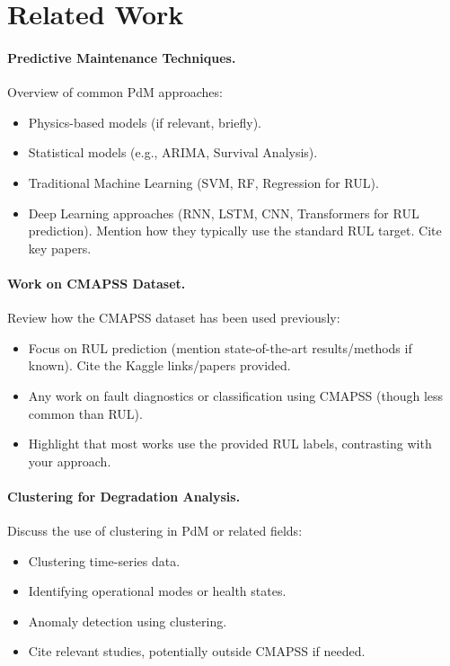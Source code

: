 \section{Related Work}
\label{sec:related_work}


\paragraph{Predictive Maintenance Techniques.}
Overview of common PdM approaches:
\begin{itemize}
    \item Physics-based models (if relevant, briefly).
    \item Statistical models (e.g., ARIMA, Survival Analysis).
    \item Traditional Machine Learning (SVM, RF, Regression for RUL).
    \item Deep Learning approaches (RNN, LSTM, CNN, Transformers for RUL prediction). Mention how they typically use the standard RUL target. Cite key papers.
\end{itemize}

\paragraph{Work on CMAPSS Dataset.}
Review how the CMAPSS dataset has been used previously:
\begin{itemize}
    \item Focus on RUL prediction (mention state-of-the-art results/methods if known). Cite the Kaggle links/papers provided.
    \item Any work on fault diagnostics or classification using CMAPSS (though less common than RUL).
    \item Highlight that most works use the provided RUL labels, contrasting with your approach.
\end{itemize}

\paragraph{Clustering for Degradation Analysis.}
Discuss the use of clustering in PdM or related fields:
\begin{itemize}
    \item Clustering time-series data.
    \item Identifying operational modes or health states.
    \item Anomaly detection using clustering.
    \item Cite relevant studies, potentially outside CMAPSS if needed.
\end{itemize}

